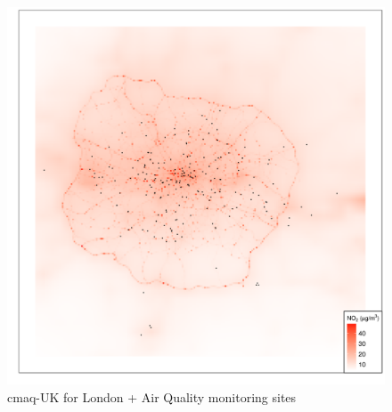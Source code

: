 \begin{figure}[H]
\centering
\includegraphics[scale=0.5]{images/cmaq_and_monitoring_sites.png}
\caption{\gls{cmaq}-UK for London + Air Quality monitoring sites}
\label{fig:cmaq_and_monitoring_sites}
\end{figure}

